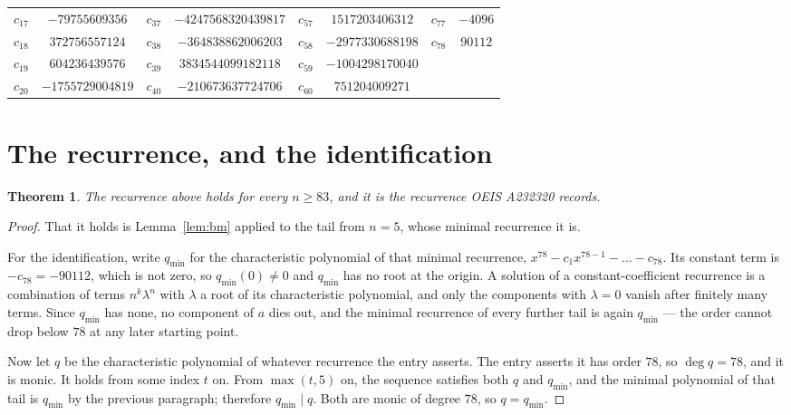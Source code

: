 \documentclass[11pt,a4paper]{article}
\theoremstyle{plain}
\newtheorem{theorem}{Theorem}
\theoremstyle{definition}
\begin{document}
\begin{center}
\begin{tabular}{cccccccc}
$c_{17}$ & $-79755609356$ & $c_{37}$ & $-4247568320439817$ & $c_{57}$ & $1517203406312$ & $c_{77}$ & $-4096$ \\
$c_{18}$ & $372756557124$ & $c_{38}$ & $-364838862006203$ & $c_{58}$ & $-2977330688198$ & $c_{78}$ & $90112$ \\
$c_{19}$ & $604236439576$ & $c_{39}$ & $3834544099182118$ & $c_{59}$ & $-1004298170040$ &  &  \\
$c_{20}$ & $-1755729004819$ & $c_{40}$ & $-210673637724706$ & $c_{60}$ & $751204009271$ &  &  \\
\end{tabular}
\end{center}

\section{The recurrence, and the identification}

\begin{theorem}
The recurrence above holds for every $n\ge83$, and it is the recurrence OEIS A232320 records.
\end{theorem}

\begin{proof}
That it holds is Lemma~\ref{lem:bm} applied to the tail from $n=5$, whose minimal
recurrence it is.

For the identification, write $q_{\min}$ for the characteristic polynomial of that minimal
recurrence, $x^{78}-c_1x^{78-1}-\dots-c_{78}$. Its constant term is
$-c_{78}=-90112$, which is not zero, so $q_{\min}(0)\neq0$ and $q_{\min}$ has no
root at the origin. A solution of a constant-coefficient recurrence is a combination of terms
$n^{k}\lambda^{n}$ with $\lambda$ a root of its characteristic polynomial, and only the
components with $\lambda=0$ vanish after finitely many terms. Since $q_{\min}$ has none, no
component of $a$ dies out, and the minimal recurrence of every further tail is again
$q_{\min}$ --- the order cannot drop below $78$ at any later starting point.

Now let $q$ be the characteristic polynomial of whatever recurrence the entry asserts. The
entry asserts it has order $78$, so $\deg q=78$, and it is monic. It holds from some
index $t$ on. From $\max(t,5)$ on, the sequence satisfies both $q$ and $q_{\min}$, and
the minimal polynomial of that tail is $q_{\min}$ by the previous paragraph; therefore
$q_{\min}\mid q$. Both are monic of degree $78$, so $q=q_{\min}$.
\end{proof}
\end{document}
